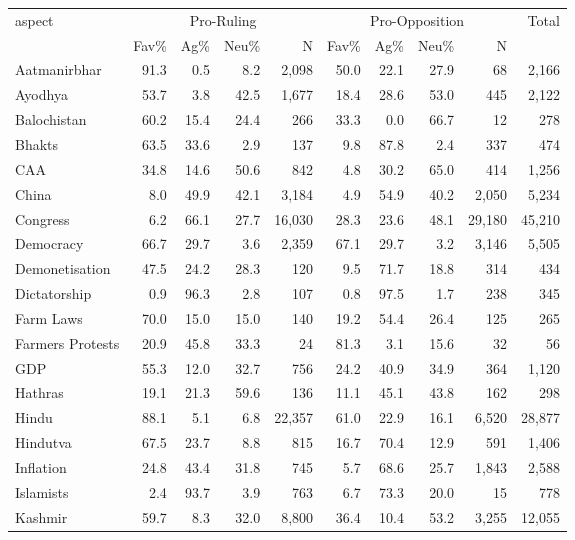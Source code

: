 \begin{table}[htbp]
\centering
\scriptsize
\setlength{\tabcolsep}{4pt}
\begin{tabular}{lrrrrrrrrr}
\toprule
\multirow{2}{*}{aspect} & \multicolumn{4}{c}{Pro-Ruling} & \multicolumn{4}{c}{Pro-Opposition} & \multirow{2}{*}{Total} \\
\cmidrule(lr){2-5}\cmidrule(lr){6-9}
& Fav\% & Ag\% & Neu\% & N & Fav\% & Ag\% & Neu\% & N & \\
\midrule
Aatmanirbhar & 91.3 & 0.5 & 8.2 & 2,098 & 50.0 & 22.1 & 27.9 & 68 & 2,166 \\
Ayodhya & 53.7 & 3.8 & 42.5 & 1,677 & 18.4 & 28.6 & 53.0 & 445 & 2,122 \\
Balochistan & 60.2 & 15.4 & 24.4 & 266 & 33.3 & 0.0 & 66.7 & 12 & 278 \\
Bhakts & 63.5 & 33.6 & 2.9 & 137 & 9.8 & 87.8 & 2.4 & 337 & 474 \\
CAA & 34.8 & 14.6 & 50.6 & 842 & 4.8 & 30.2 & 65.0 & 414 & 1,256 \\
China & 8.0 & 49.9 & 42.1 & 3,184 & 4.9 & 54.9 & 40.2 & 2,050 & 5,234 \\
Congress & 6.2 & 66.1 & 27.7 & 16,030 & 28.3 & 23.6 & 48.1 & 29,180 & 45,210 \\
Democracy & 66.7 & 29.7 & 3.6 & 2,359 & 67.1 & 29.7 & 3.2 & 3,146 & 5,505 \\
Demonetisation & 47.5 & 24.2 & 28.3 & 120 & 9.5 & 71.7 & 18.8 & 314 & 434 \\
Dictatorship & 0.9 & 96.3 & 2.8 & 107 & 0.8 & 97.5 & 1.7 & 238 & 345 \\
Farm Laws & 70.0 & 15.0 & 15.0 & 140 & 19.2 & 54.4 & 26.4 & 125 & 265 \\
Farmers Protests & 20.9 & 45.8 & 33.3 & 24 & 81.3 & 3.1 & 15.6 & 32 & 56 \\
GDP & 55.3 & 12.0 & 32.7 & 756 & 24.2 & 40.9 & 34.9 & 364 & 1,120 \\
Hathras & 19.1 & 21.3 & 59.6 & 136 & 11.1 & 45.1 & 43.8 & 162 & 298 \\
Hindu & 88.1 & 5.1 & 6.8 & 22,357 & 61.0 & 22.9 & 16.1 & 6,520 & 28,877 \\
Hindutva & 67.5 & 23.7 & 8.8 & 815 & 16.7 & 70.4 & 12.9 & 591 & 1,406 \\
Inflation & 24.8 & 43.4 & 31.8 & 745 & 5.7 & 68.6 & 25.7 & 1,843 & 2,588 \\
Islamists & 2.4 & 93.7 & 3.9 & 763 & 6.7 & 73.3 & 20.0 & 15 & 778 \\
Kashmir & 59.7 & 8.3 & 32.0 & 8,800 & 36.4 & 10.4 & 53.2 & 3,255 & 12,055 \\

\end{tabular}
\end{table}
